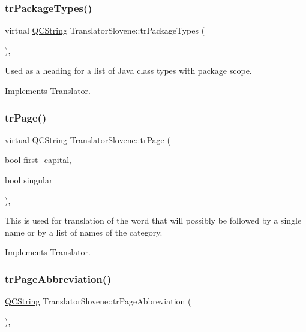 \subsubsection{\texorpdfstring{trPackageTypes()}{trPackageTypes()}}
{\footnotesize\ttfamily virtual \mbox{\hyperlink{class_q_c_string}{Q\+C\+String}} Translator\+Slovene\+::tr\+Package\+Types (\begin{DoxyParamCaption}{ }\end{DoxyParamCaption})\hspace{0.3cm}{\ttfamily [inline]}, {\ttfamily [virtual]}}

Used as a heading for a list of Java class types with package scope. 

Implements \mbox{\hyperlink{class_translator}{Translator}}.

\mbox{\label{class_translator_slovene_ae26ecc1bf1bbe892497d347910bd930f}} 
\subsubsection{\texorpdfstring{trPage()}{trPage()}}
{\footnotesize\ttfamily virtual \mbox{\hyperlink{class_q_c_string}{Q\+C\+String}} Translator\+Slovene\+::tr\+Page (\begin{DoxyParamCaption}\item[{bool}]{first\+\_\+capital,  }\item[{bool}]{singular }\end{DoxyParamCaption})\hspace{0.3cm}{\ttfamily [inline]}, {\ttfamily [virtual]}}

This is used for translation of the word that will possibly be followed by a single name or by a list of names of the category. 

Implements \mbox{\hyperlink{class_translator}{Translator}}.

\mbox{\label{class_translator_slovene_a80c864485225b2018f3c518f3f95c1f1}} 
\subsubsection{\texorpdfstring{trPageAbbreviation()}{trPageAbbreviation()}}
{\footnotesize\ttfamily \mbox{\hyperlink{class_q_c_string}{Q\+C\+String}} Translator\+Slovene\+::tr\+Page\+Abbreviation (\begin{DoxyParamCaption}{ }\end{DoxyParamCaption})\hspace{0.3cm}{\ttfamily [inline]}, {\ttfamily [virtual]}}

